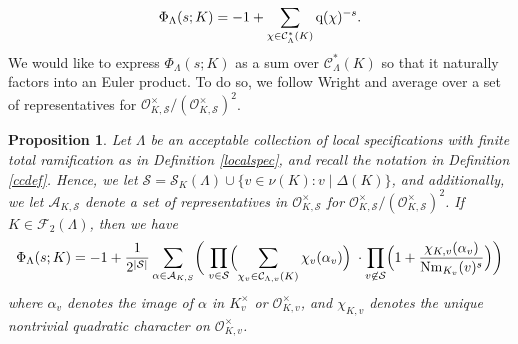 \documentclass[10pt]{article}
\theoremstyle{plain}
\newtheorem{proposition}[thm]{Proposition}
\theoremstyle{definition}
\theoremstyle{remark}
\def\O{{\mathcal O}}
\def\cC{{\mathcal C}}
\def\cF{{\mathcal F}}
\def\cO{{\mathcal O}}
\def\cS{{\mathcal S}}
\newcommand{\q}{{\rm q}}
\newcommand{\cA}{{\mathcal A}}
\DeclareMathOperator{\Nm}{Nm}
\begin{document}
\begin{equation}\label{phichi}
\Phi_{\Lambda}(s;K) = -1+\sum_{\chi \in \cC^\ast_{\Lambda}(K)} \q(\chi)^{-s}.
\end{equation}
We would like to express $\Phi_{\Lambda}(s;K)$ as a sum over $\cC_\Lambda^\ast(K)$ so that it naturally factors into an Euler product. To do so, we follow Wright \cite{MR969545} and average over a set of representatives for $\O_{K,\cS}^\times/(\O_{K,\cS}^{\times})^2$. 
\begin{proposition}\label{propwrightexp}
Let $\Lambda$ be an acceptable collection of local
specifications with finite total ramification as in Definition \ref{localspec}, and recall the notation in Definition \ref{ccdef}. Hence, we let 
$\cS  = \cS_K(\Lambda)\cup\{v \in \nu(K) :v\mid\Delta(K)\}$, and additionally, we let
$\cA_{K,\cS}$ denote a set of representatives in $\O_{K,\cS}^\times$
for $\O_{K,\cS}^\times/(\O_{K,\cS}^{\times})^2$. If $K \in \cF_2(\Lambda)$, then we have
\begin{equation}\label{eqepgen}
  \Phi_{\Lambda}(s;K)=-1+\frac{1}{2^{|\cS|}}
  \sum_{\alpha\in\cA_{K,S}}\biggl(\;\prod_{{v\in \cS}}
  \Bigl(\sum_{ \chi_v \in \cC_{\Lambda,v}(K)}
  \chi_v(\alpha_v)\Bigr)\;\cdot
  \prod_{v\not\in \cS}\Bigl(1+\frac{\chi_{K,v}(\alpha_v)}{\Nm_{K_v}(v)^s}\Bigr)
  \biggl)
\end{equation}
where $\alpha_v$ denotes the image of $\alpha$ in $K_v^\times$ or $\cO_{K,v}^\times$, and $\chi_{K,v}$ denotes the unique nontrivial quadratic character
on $\O_{K,v}^\times$.
\end{proposition}
\end{document}
